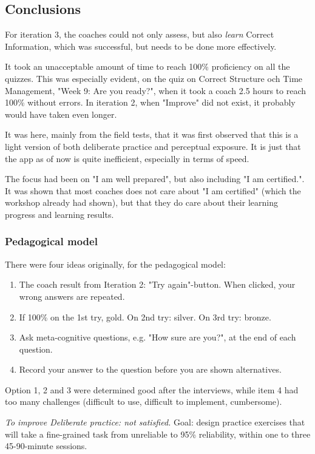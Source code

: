 \subsection{Conclusions}

  For iteration 3, the coaches could not only assess, but also \textit{learn} Correct Information, which was successful, but needs to be done more effectively.

  It took an unacceptable amount of time to reach 100\% proficiency on all the quizzes. This was especially evident, on the quiz on Correct Structure och Time Management, "Week 9: Are you ready?", when it took a coach 2.5 hours to reach 100\% without errors. In iteration 2, when "Improve" did not exist, it probably would have taken even longer.

  It was here, mainly from the field tests, that it was first observed that this is a light version of both deliberate practice and perceptual exposure. It is just that the app as of now is quite inefficient, especially in terms of speed.

  The focus had been on "I am well prepared", but also including "I am certified.". It was shown that most coaches does not care about "I am certified" (which the workshop already had shown), but that they do care about their learning progress and learning results.

  \subsubsection{Pedagogical model}
  There were four ideas originally, for the pedagogical model:

  \begin{enumerate}
  \item The coach result from Iteration 2: "Try again"-button. When clicked, your wrong answers are repeated.
  \item If 100\% on the 1st try, gold. On 2nd try: silver. On 3rd try: bronze.
  \item Ask meta-cognitive questions, e.g. "How sure are you?", at the end of each question.
  \item Record your answer to the question before you are shown alternatives.
  \end{enumerate}

  Option 1, 2 and 3 were determined good after the interviews, while item 4 had too many challenges (difficult to use, difficult to implement, cumbersome).

  \textit{To improve Deliberate practice: not satisfied.}
  Goal: design practice exercises that will take a fine-grained task from unreliable to 95\% reliability, within one to three 45-90-minute sessions.

